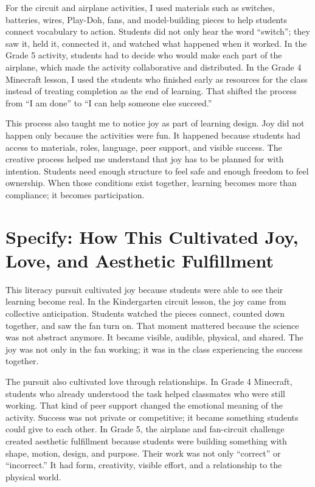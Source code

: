 \documentclass[12pt]{article}
\begin{document}
For the circuit and airplane activities, I used materials such as switches, batteries, wires, Play-Doh, fans, and model-building pieces to help students connect vocabulary to action. Students did not only hear the word ``switch''; they saw it, held it, connected it, and watched what happened when it worked. In the Grade 5 activity, students had to decide who would make each part of the airplane, which made the activity collaborative and distributed. In the Grade 4 Minecraft lesson, I used the students who finished early as resources for the class instead of treating completion as the end of learning. That shifted the process from ``I am done'' to ``I can help someone else succeed.''

This process also taught me to notice joy as part of learning design. Joy did not happen only because the activities were fun. It happened because students had access to materials, roles, language, peer support, and visible success. The creative process helped me understand that joy has to be planned for with intention. Students need enough structure to feel safe and enough freedom to feel ownership. When those conditions exist together, learning becomes more than compliance; it becomes participation.

\section*{Specify: How This Cultivated Joy, Love, and Aesthetic Fulfillment}

This literacy pursuit cultivated joy because students were able to see their learning become real. In the Kindergarten circuit lesson, the joy came from collective anticipation. Students watched the pieces connect, counted down together, and saw the fan turn on. That moment mattered because the science was not abstract anymore. It became visible, audible, physical, and shared. The joy was not only in the fan working; it was in the class experiencing the success together.

The pursuit also cultivated love through relationships. In Grade 4 Minecraft, students who already understood the task helped classmates who were still working. That kind of peer support changed the emotional meaning of the activity. Success was not private or competitive; it became something students could give to each other. In Grade 5, the airplane and fan-circuit challenge created aesthetic fulfillment because students were building something with shape, motion, design, and purpose. Their work was not only ``correct'' or ``incorrect.'' It had form, creativity, visible effort, and a relationship to the physical world.
\end{document}
